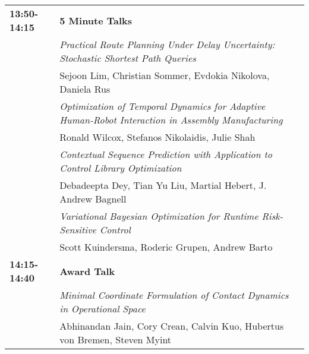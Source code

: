 \begin{tabular}{lp{13.8cm}}
{\bf 13:50-14:15} & {\bf 5 Minute Talks} \\[2mm]
& \em{ Practical Route Planning Under Delay Uncertainty: Stochastic Shortest Path Queries}\\
& Sejoon Lim\label{Lim}, Christian Sommer, Evdokia Nikolova, Daniela Rus\\[2mm]
& \em{ Optimization of Temporal Dynamics for Adaptive Human-Robot Interaction in Assembly Manufacturing}\\
& Ronald Wilcox\label{Wilcox}, Stefanos Nikolaidis, Julie Shah\\[2mm]
& \em{ Contextual Sequence Prediction with Application to Control Library Optimization}\\
& Debadeepta Dey\label{Dey}, Tian Yu Liu, Martial Hebert, J. Andrew Bagnell\\[2mm]
& \em{ Variational Bayesian Optimization for Runtime Risk-Sensitive Control}\\
& Scott Kuindersma\label{Kuindersma}, Roderic Grupen, Andrew Barto\\[2mm]

{\bf 14:15-14:40} & {\bf Award Talk} \\[2mm]
& \em{ Minimal Coordinate Formulation of Contact Dynamics in Operational Space}\\
& Abhinandan Jain\label{Jain}, Cory Crean, Calvin Kuo, Hubertus von Bremen, Steven Myint\\[2mm]
\end{tabular}

